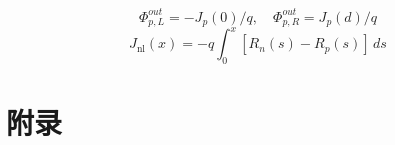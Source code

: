 \documentclass[11pt,a4paper]{article}
\begin{document}
\begin{equation}
\Phi_{p,L}^{out}=-J_p(0)/q,\quad\Phi_{p,R}^{out}=J_p(d)/q
\label{eq:61}\end{equation}
\begin{equation}
J_{\mathrm{nl}}(x)=-q\int_0^x[R_n(s)-R_p(s)]\,ds
\label{eq:62}\end{equation}
\medskip
\begingroup\fontsize{10.6}{15.5}\selectfont\setlength{\parskip}{6pt plus 1pt}
\clearpage
\part*{{\cjkfont 附录}\allowbreak{} \allowbreak{}}
\FloatBarrier
\Needspace{110pt}
\end{document}
